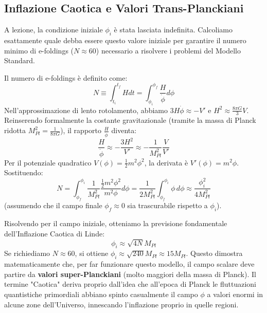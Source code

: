 \documentclass[11pt,a4paper]{report}
\begin{document}
\subsection{Inflazione Caotica e Valori Trans-Planckiani}
A lezione, la condizione iniziale $\phi_i$ è stata lasciata indefinita. Calcoliamo esattamente quale debba essere questo valore iniziale per garantire il numero minimo di e-foldings ($N \approx 60$) necessario a risolvere i problemi del Modello Standard.

Il numero di e-foldings è definito come:
\begin{equation}
N \equiv \int_{t_i}^{t_f} H dt = \int_{\phi_i}^{\phi_f} \frac{H}{\dot{\phi}} d\phi
\end{equation}
Nell'approssimazione di lento rotolamento, abbiamo $3H\dot{\phi} \approx -V'$ e $H^2 \approx \frac{8\pi G}{3}V$. Reinserendo formalmente la costante gravitazionale (tramite la massa di Planck ridotta $M_{Pl}^2 = \frac{1}{8\pi G}$), il rapporto $\frac{H}{\dot{\phi}}$ diventa:
\begin{equation}
\frac{H}{\dot{\phi}} \approx -\frac{3H^2}{V'} \approx -\frac{1}{M_{Pl}^2} \frac{V}{V'}
\end{equation}
Per il potenziale quadratico $V(\phi) = \frac{1}{2}m^2\phi^2$, la derivata è $V'(\phi) = m^2\phi$. Sostituendo:
\begin{equation}
N = \int_{\phi_f}^{\phi_i} \frac{1}{M_{Pl}^2} \frac{\frac{1}{2}m^2\phi^2}{m^2\phi} d\phi = \frac{1}{2M_{Pl}^2} \int_{\phi_f}^{\phi_i} \phi \, d\phi \approx \frac{\phi_i^2}{4M_{Pl}^2}
\end{equation}
(assumendo che il campo finale $\phi_f \approx 0$ sia trascurabile rispetto a $\phi_i$).

Risolvendo per il campo iniziale, otteniamo la previsione fondamentale dell'Inflazione Caotica di Linde:
\begin{equation}
\phi_i \approx \sqrt{4N} M_{Pl}
\end{equation}
Se richiediamo $N \approx 60$, si ottiene $\phi_i \approx \sqrt{240} M_{Pl} \approx 15 M_{Pl}$.
Questo dimostra matematicamente che, per far funzionare questo modello, il campo scalare deve partire da \textbf{valori super-Planckiani} (molto maggiori della massa di Planck). Il termine "Caotica" deriva proprio dall'idea che all'epoca di Planck le fluttuazioni quantistiche primordiali abbiano spinto casualmente il campo $\phi$ a valori enormi in alcune zone dell'Universo, innescando l'inflazione proprio in quelle regioni.
\end{document}
